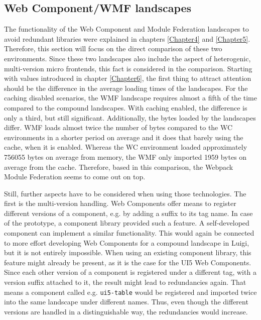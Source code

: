 \subsection{Web Component/WMF landscapes}

The functionality of the Web Component and Module Federation landscapes to avoid redundant libraries were explained in chapters \ref{Chapter4} and \ref{Chapter5}. 
Therefore, this section will focus on the direct comparison of these two environments. 
Since these two landscapes also include the aspect of heterogenic, multi-version micro frontends, this fact is considered in the comparison. 
Starting with values introduced in chapter \ref{Chapter6}, the first thing to attract attention should be the difference in the average loading times of the landscapes. 
For the caching disabled scenarios, the WMF landscape requires almost a fifth of the time compared to the compound landscapes. 
With caching enabled, the difference is only a third, but still significant. 
Additionally, the bytes loaded by the landscapes differ. 
WMF loads almost twice the number of bytes compared to the WC environments in a shorter period on average and it does that barely using the cache, when it is enabled. 
Whereas the WC environment loaded approximately 756055 bytes on average from memory, the WMF only imported 1959 bytes on average from the cache. 
Therefore, based in this comparison, the Webpack Module Federation seems to come out on top.

Still, further aspects have to be considered when using those technologies. 
The first is the multi-version handling. 
Web Components offer means to register different versions of a component, e.g. by adding a suffix to its tag name. 
In case of the prototype, a component library provided such a feature. 
A self-developed component can implement a similar functionality. 
This would again be connected to more effort developing Web Components for a compound landscape in Luigi, but it is not entirely impossible.
When using an existing component library, this feature might already be present, as it is the case for the UI5 Web Components. 
Since each other version of a component is registered under a different tag, with a version suffix attached to it, the result might lead to redundancies again. 
That means a component called e.g. \texttt{ui5-table} would be registered and imported twice into the same landscape under different names. 
Thus, even though the different versions are handled in a distinguishable way, the redundancies would increase.

